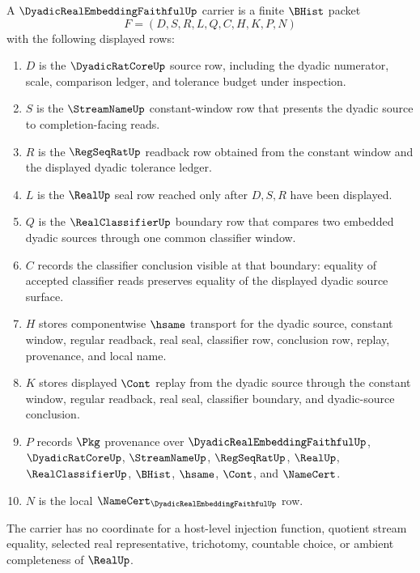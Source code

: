 \begin{definition}
\label{def:dyadic-real-embedding-faithful-carrier}
A $\DyadicRealEmbeddingFaithfulUp$ carrier is a finite $\BHist$ packet
$$
F=(D,S,R,L,Q,C,H,K,P,N)
$$
with the following displayed rows:
\begin{enumerate}
\item $D$ is the $\DyadicRatCoreUp$ source row, including the dyadic numerator, scale, comparison ledger, and tolerance budget under inspection.
\item $S$ is the $\StreamNameUp$ constant-window row that presents the dyadic source to completion-facing reads.
\item $R$ is the $\RegSeqRatUp$ readback row obtained from the constant window and the displayed dyadic tolerance ledger.
\item $L$ is the $\RealUp$ seal row reached only after $D,S,R$ have been displayed.
\item $Q$ is the $\RealClassifierUp$ boundary row that compares two embedded dyadic sources through one common classifier window.
\item $C$ records the classifier conclusion visible at that boundary: equality of accepted classifier reads preserves equality of the displayed dyadic source surface.
\item $H$ stores componentwise $\hsame$ transport for the dyadic source, constant window, regular readback, real seal, classifier row, conclusion row, replay, provenance, and local name.
\item $K$ stores displayed $\Cont$ replay from the dyadic source through the constant window, regular readback, real seal, classifier boundary, and dyadic-source conclusion.
\item $P$ records $\Pkg$ provenance over $\DyadicRealEmbeddingFaithfulUp$, $\DyadicRatCoreUp$, $\StreamNameUp$, $\RegSeqRatUp$, $\RealUp$, $\RealClassifierUp$, $\BHist$, $\hsame$, $\Cont$, and $\NameCert$.
\item $N$ is the local $\NameCert_{\DyadicRealEmbeddingFaithfulUp}$ row.
\end{enumerate}
The carrier has no coordinate for a host-level injection function, quotient stream equality, selected real representative, trichotomy, countable choice, or ambient completeness of $\RealUp$.
\end{definition}

